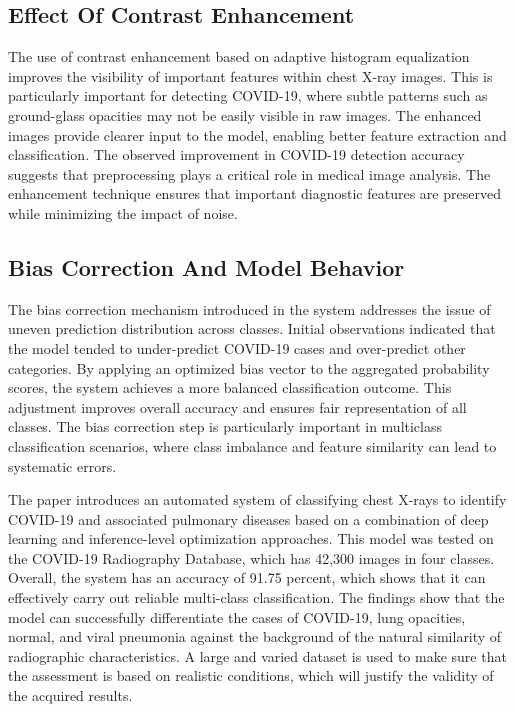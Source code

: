 \documentclass[a4paper,fleqn]{cas-dc}
\begin{document}
\subsection{Effect Of Contrast Enhancement}
The use of contrast enhancement based on adaptive histogram equalization improves the visibility of important features within chest X-ray images. This is particularly important for detecting COVID-19, where subtle patterns such as ground-glass opacities may not be easily visible in raw images. The enhanced images provide clearer input to the model, enabling better feature extraction and classification. The observed improvement in COVID-19 detection accuracy suggests that preprocessing plays a critical role in medical image analysis. The enhancement technique ensures that important diagnostic features are preserved while minimizing the impact of noise.

\subsection{Bias Correction And Model Behavior}
The bias correction mechanism introduced in the system addresses the issue of uneven prediction distribution across classes. Initial observations indicated that the model tended to under-predict COVID-19 cases and over-predict other categories. By applying an optimized bias vector to the aggregated probability scores, the system achieves a more balanced classification outcome. This adjustment improves overall accuracy and ensures fair representation of all classes. The bias correction step is particularly important in multiclass classification scenarios, where class imbalance and feature similarity can lead to systematic errors.

\sectionCONCLUSION
The paper introduces an automated system of classifying chest X-rays to identify COVID-19 and associated pulmonary diseases based on a combination of deep learning and inference-level optimization approaches. This model was tested on the COVID-19 Radiography Database, which has 42,300 images in four classes. Overall, the system has an accuracy of 91.75 percent, which shows that it can effectively carry out reliable multi-class classification. The findings show that the model can successfully differentiate the cases of COVID-19, lung opacities, normal, and viral pneumonia against the background of the natural similarity of radiographic characteristics. A large and varied dataset is used to make sure that the assessment is based on realistic conditions, which will justify the validity of the acquired results.
\end{document}
